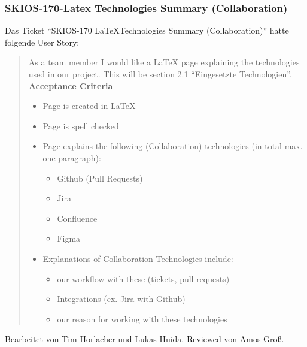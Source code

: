 \subsubsection{SKIOS-170-Latex Technologies Summary (Collaboration)}
Das Ticket \enquote{SKIOS-170 \LaTeX Technologies Summary (Collaboration)} hatte folgende User Story:
\begin{quotation}
    As a team member I would like a LaTeX page explaining the technologies used in our project.
    This will be section 2.1 \enquote{Eingesetzte Technologien}. \\
\textbf{Acceptance Criteria}
\begin{itemize}
    \item Page is created in LaTeX
    \item Page is spell checked
    \item Page explains the following (Collaboration) technologies (in total max. one paragraph):
    \begin{itemize}
        \item Github (Pull Requests)
        \item Jira
        \item Confluence
        \item Figma
    \end{itemize}
    \item Explanations of Collaboration Technologies include:
    \begin{itemize}
        \item our workflow with these (tickets, pull requests)
        \item Integrations (ex. Jira with Github)
        \item our reason for working with these technologies
    \end{itemize}
\end{itemize}
\end{quotation}
Bearbeitet von Tim Horlacher und Lukas Huida.
Reviewed von Amos Groß.

